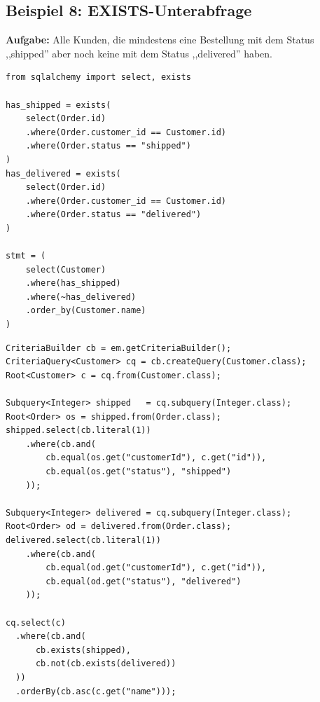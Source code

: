 \subsection{Beispiel 8: EXISTS-Unterabfrage}
\label{subsec:bsp8}

\textbf{Aufgabe:} Alle Kunden, die mindestens eine Bestellung mit dem Status
,,shipped'' aber noch keine mit dem Status ,,delivered'' haben.

\begin{lstlisting}[style=pythonstyle, caption={Beispiel 8 -- Python (EXISTS)},
  label=lst:bsp8_py]
from sqlalchemy import select, exists

has_shipped = exists(
    select(Order.id)
    .where(Order.customer_id == Customer.id)
    .where(Order.status == "shipped")
)
has_delivered = exists(
    select(Order.id)
    .where(Order.customer_id == Customer.id)
    .where(Order.status == "delivered")
)

stmt = (
    select(Customer)
    .where(has_shipped)
    .where(~has_delivered)
    .order_by(Customer.name)
)
\end{lstlisting}

\begin{lstlisting}[style=javastyle, caption={Beispiel 8 -- Java (EXISTS)},
  label=lst:bsp8_java]
CriteriaBuilder cb = em.getCriteriaBuilder();
CriteriaQuery<Customer> cq = cb.createQuery(Customer.class);
Root<Customer> c = cq.from(Customer.class);

Subquery<Integer> shipped   = cq.subquery(Integer.class);
Root<Order> os = shipped.from(Order.class);
shipped.select(cb.literal(1))
    .where(cb.and(
        cb.equal(os.get("customerId"), c.get("id")),
        cb.equal(os.get("status"), "shipped")
    ));

Subquery<Integer> delivered = cq.subquery(Integer.class);
Root<Order> od = delivered.from(Order.class);
delivered.select(cb.literal(1))
    .where(cb.and(
        cb.equal(od.get("customerId"), c.get("id")),
        cb.equal(od.get("status"), "delivered")
    ));

cq.select(c)
  .where(cb.and(
      cb.exists(shipped),
      cb.not(cb.exists(delivered))
  ))
  .orderBy(cb.asc(c.get("name")));
\end{lstlisting}

